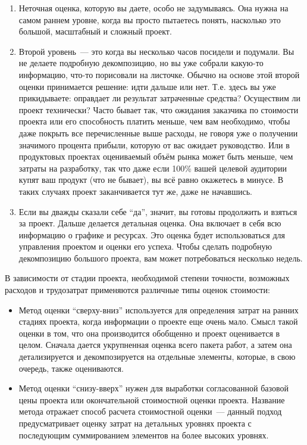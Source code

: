 \documentclass{../../text-style}
\begin{document}
\begin{enumerate}
    \item Неточная оценка, которую вы даете, особо не задумываясь. Она нужна на самом раннем уровне, когда вы просто пытаетесь понять, насколько это большой, масштабный и сложный проект.
    \item Второй уровень~--- это когда вы несколько часов посидели и подумали. Вы не делаете подробную декомпозицию, но вы уже собрали какую-то информацию, что-то порисовали на листочке. Обычно на основе этой второй оценки принимается решение: идти дальше или нет. Т.е. здесь вы уже прикидываете: оправдает ли результат затраченные средства? Осуществим ли проект технически? Часто бывает так, что ожидания заказчика по стоимости проекта или его способность платить меньше, чем вам необходимо, чтобы даже покрыть все перечисленные выше расходы, не говоря уже о получении значимого процента прибыли, которую от вас ожидает руководство. Или в продуктовых проектах оцениваемый объём рынка может быть меньше, чем затраты на разработку, так что даже если 100\% вашей целевой аудитории купят ваш продукт (что не бывает), вы всё равно окажетесь в минусе. В таких случаях проект заканчивается тут же, даже не начавшись.
    \item Если вы дважды сказали себе \enquote{да}, значит, вы готовы продолжить и взяться за проект. Дальше делается детальная оценка. Она включает в себя всю информацию о графике и ресурсах. Это оценка будет использоваться для управления проектом и оценки его успеха. Чтобы сделать подробную декомпозицию большого проекта, вам может потребоваться несколько недель.
\end{enumerate}

В зависимости от стадии проекта, необходимой степени точности, возможных расходов и трудозатрат применяются различные типы оценок стоимости:
\begin{itemize}
    \item Метод оценки \enquote{сверху-вниз} используется для определения затрат на ранних стадиях проекта, когда информации о проекте еще очень мало. Смысл такой оценки в том, что она производится обобщенно и проект оценивается в целом. Сначала дается укрупненная оценка всего пакета работ, а затем она детализируется и декомпозируется на отдельные элементы, которые, в свою очередь, также оцениваются.
    \item Метод оценки \enquote{снизу-вверх} нужен для выработки согласованной базовой цены проекта или окончательной стоимостной оценки проекта. Название метода отражает способ расчета стоимостной оценки~--- данный подход предусматривает оценку затрат на детальных уровнях проекта с последующим суммированием элементов на более высоких уровнях.
\end{itemize}
\end{document}
